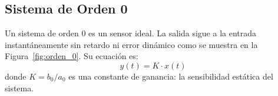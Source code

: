 \subsection{Sistema de Orden 0}
Un sistema de orden 0 es un sensor ideal. La salida sigue a la entrada instantáneamente sin retardo ni error dinámico como se muestra en la Figura~\ref{fig:orden_0}. Su ecuación es:
\[ y(t) = K \cdot x(t) \]
donde $K = b_0/a_0$ es una constante de ganancia: la sensibilidad estática del sistema.
\begin{marginfigure}
    \centering
    \caption[Respuesta al escalón de un sistema de orden 0.]{Respuesta al escalón de un sistema de orden 0. La salida sigue a la entrada instantáneamente sin retardo ni error dinámico.}\label{fig:orden_0}
\end{marginfigure}


